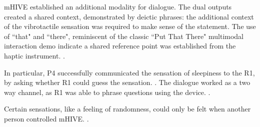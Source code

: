 



mHIVE %
established an additional modality for dialogue.
The dual outputs created a shared context, demonstrated by deictic phrases: the additional context of the vibrotactile sensation was required to make sense of the statement.
The use of ``that" and ``there", reminiscent of the classic ``Put That There" multimodal interaction demo \cite{Bolt1980} indicate a shared reference point was established from the haptic instrument.
.

In particular, P4 successfully communicated the sensation of sleepiness to the R1, by asking whether R1 could guess the sensation.
  .
The dialogue worked as a two way channel, as R1 was able to phrase questions using the device.
	  .%

Certain sensations, like a feeling of randomness, could only be felt when another person controlled mHIVE.
	.


	
	

